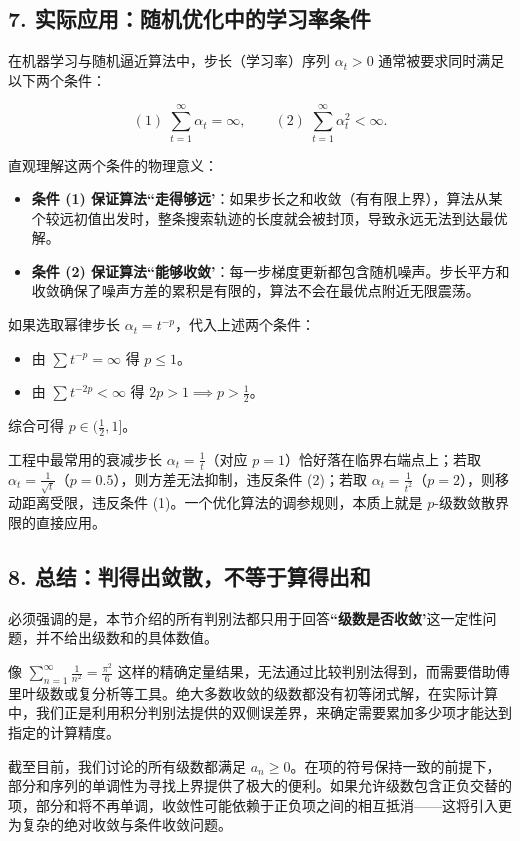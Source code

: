 \subsection{7. 实际应用：随机优化中的学习率条件}

在机器学习与随机逼近算法中，步长（学习率）序列 \(\alpha_t > 0\) 通常被要求同时满足以下两个条件：

\[
(1)\;\sum_{t=1}^{\infty}\alpha_t = \infty,
\qquad
(2)\;\sum_{t=1}^{\infty}\alpha_t^2 < \infty.
\]

直观理解这两个条件的物理意义：
\begin{itemize}
    \item \textbf{条件 (1) 保证算法``走得够远'}：如果步长之和收敛（有有限上界），算法从某个较远初值出发时，整条搜索轨迹的长度就会被封顶，导致永远无法到达最优解。
    \item \textbf{条件 (2) 保证算法``能够收敛'}：每一步梯度更新都包含随机噪声。步长平方和收敛确保了噪声方差的累积是有限的，算法不会在最优点附近无限震荡。
\end{itemize}

如果选取幂律步长 \(\alpha_t = t^{-p}\)，代入上述两个条件：
\begin{itemize}
    \item 由 \(\sum t^{-p} = \infty\) 得 \(p \le 1\)。
    \item 由 \(\sum t^{-2p} < \infty\) 得 \(2p > 1 \implies p > \frac{1}{2}\)。
\end{itemize}

综合可得 \(p \in (\frac{1}{2}, 1]\)。

工程中最常用的衰减步长 \(\alpha_t = \frac{1}{t}\)（对应 \(p=1\)）恰好落在临界右端点上；若取 \(\alpha_t = \frac{1}{\sqrt{t}}\)（\(p=0.5\)），则方差无法抑制，违反条件 (2)；若取 \(\alpha_t = \frac{1}{t^2}\)（\(p=2\)），则移动距离受限，违反条件 (1)。一个优化算法的调参规则，本质上就是 \(p\)-级数敛散界限的直接应用。


\subsection{8. 总结：判得出敛散，不等于算得出和}

必须强调的是，本节介绍的所有判别法都只用于回答\textbf{``级数是否收敛'}这一定性问题，并不给出级数和的具体数值。

像 \(\sum_{n=1}^\infty \frac{1}{n^2} = \frac{\pi^2}{6}\) 这样的精确定量结果，无法通过比较判别法得到，而需要借助傅里叶级数或复分析等工具。绝大多数收敛的级数都没有初等闭式解，在实际计算中，我们正是利用积分判别法提供的双侧误差界，来确定需要累加多少项才能达到指定的计算精度。

截至目前，我们讨论的所有级数都满足 \(a_n \ge 0\)。在项的符号保持一致的前提下，部分和序列的单调性为寻找上界提供了极大的便利。如果允许级数包含正负交替的项，部分和将不再单调，收敛性可能依赖于正负项之间的相互抵消——这将引入更为复杂的绝对收敛与条件收敛问题。

